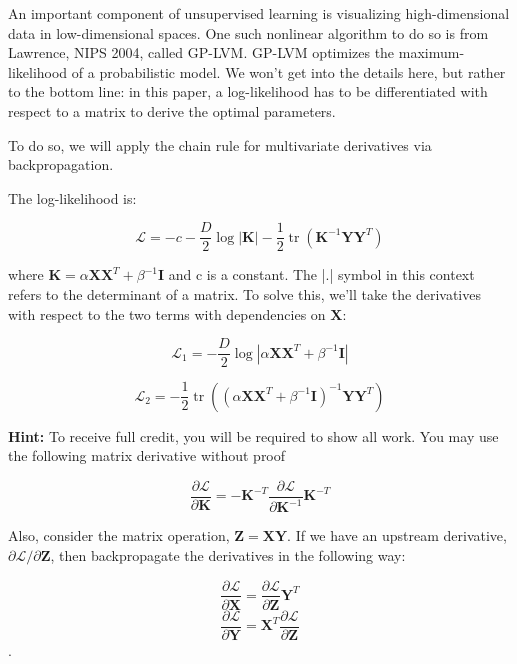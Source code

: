 \documentclass{article}
\begin{document}
An important component of unsupervised learning is visualizing high-dimensional data in low-dimensional spaces. One such nonlinear algorithm to do so is from Lawrence, NIPS 2004, called GP-LVM. GP-LVM optimizes the maximum-likelihood of a probabilistic model. We won’t get into the details here, but rather to the bottom line: in this paper, a log-likelihood has to be differentiated with respect to a matrix to derive the optimal parameters.

To do so, we will apply the chain rule for multivariate derivatives via backpropagation.

The log-likelihood is:

$$\mathcal{L} = -c - \dfrac{D}{2}\log|\mathbf{K}| - \dfrac{1}{2}\operatorname{tr}(\mathbf{K}^{-1}\mathbf{Y}\mathbf{Y}^T)$$

where $\mathbf{K} = \alpha \mathbf{X}\mathbf{X}^T + \beta^{-1}\mathbf{I}$ and c is a constant. The |.| symbol in this context refers to the determinant of a matrix. To solve this, we’ll take the derivatives with respect to the two terms with dependencies on $\mathbf{X}$:

$$\mathcal{L}_1 = - \dfrac{D}{2}\log|\alpha \mathbf{X}\mathbf{X}^T + \beta^{-1}\mathbf{I}|$$

$$\mathcal{L}_2 = - \dfrac{1}{2}\operatorname{tr}((\alpha \mathbf{X}\mathbf{X}^T + \beta^{-1}\mathbf{I})^{-1}\mathbf{Y}\mathbf{Y}^T)$$

\textbf{Hint:} To receive full credit, you will be required to show all work. You may use the following
matrix derivative without proof

$$\dfrac{\partial \mathcal{L}}{\partial \mathbf{K}} = -\mathbf{K}^{-T} \dfrac{\partial \mathcal{L}}{\partial \mathbf{K}^{-1}}\mathbf{K}^{-T}$$

Also, consider the matrix operation, $\mathbf{Z} = \mathbf{XY}$. If we have an upstream derivative, $\partial \mathcal{L} / \partial \mathbf{Z}$, then backpropagate the derivatives in the following way:

$$\dfrac{\partial \mathcal{L}}{\partial \mathbf{X}} = \dfrac{\partial \mathcal{L}}{\partial \mathbf{Z}} \mathbf{Y}^T$$
$$\dfrac{\partial \mathcal{L}}{\partial \mathbf{Y}} =  \mathbf{X}^T \dfrac{\partial \mathcal{L}}{\partial \mathbf{Z}}$$
. \newline 
\end{document}
